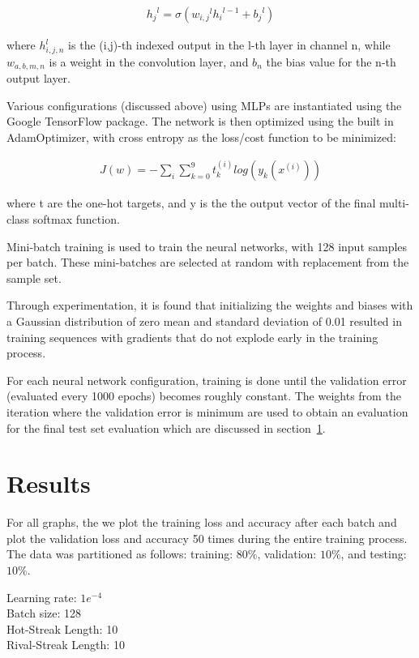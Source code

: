 \documentclass{article} %
\begin{document}
\begin{gather}
{h_{j}}^l = \sigma({w_{i,j}}^{l} {h_{i}}^{l-1} + {b_j}^l) 
\end{gather}

where $h^l_{i,j,n}$ is the (i,j)-th indexed output in the l-th layer in channel n, while $w_{a,b,m,n}$ is a weight in the convolution layer, and $b_n$ the bias value for the n-th output layer. 


Various configurations (discussed above) using MLPs are instantiated using the Google TensorFlow package.
The network is then optimized using the built in AdamOptimizer, with cross entropy as the loss/cost function to be minimized:

\begin{gather}
J(w) = - \sum_{i}{\sum_{k=0}^{9}{t^{(i)}_k}log(y_k(x^{(i)}))}
\end{gather}

where t are the one-hot targets, and y is the the output vector of the final multi-class softmax function. 

Mini-batch training is used to train the neural networks, with 128 input samples per batch.
These mini-batches are selected at random with replacement from the sample set.

Through experimentation, it is found that initializing the weights and biases with a Gaussian distribution of zero mean and standard deviation of 0.01 resulted in training sequences with gradients that do not explode early in the training process. 

For each neural network configuration, training is done until the validation error (evaluated every 1000 epochs) becomes roughly constant.
The weights from the iteration where the validation error is minimum are used to obtain an evaluation for the final test set evaluation which are discussed in section~\ref{sec:results}.




\section{Results}
\label{sec:results}

For all graphs, the we plot the training loss and accuracy after each batch and plot the validation loss and accuracy 50 times during the entire training process.
The data was partitioned as follows: training: $80\%$, validation: $10\%$, and testing: $10\%$.


Learning rate: $1e^{-4}$\\
Batch size: 128\\
Hot-Streak Length: 10\\
Rival-Streak Length: 10\\
\end{document}
